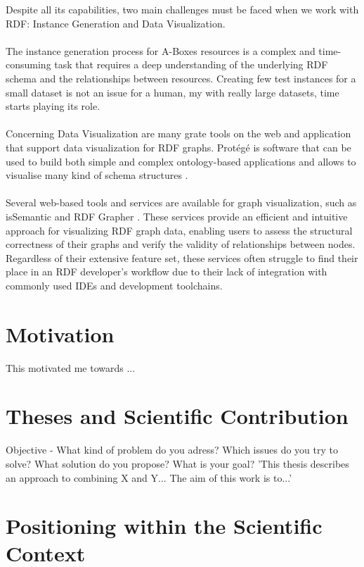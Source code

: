 Despite all its capabilities, two main challenges must be faced when we work with RDF: Instance Generation and Data Visualization.
\\
\\
The instance generation process for A-Boxes resources is a complex and time-consuming task that requires a deep understanding of the underlying RDF schema and the relationships between resources. 
Creating few test instances for a small dataset is not an issue for a human, my with really large datasets, time starts playing its role.
\\
\\
Concerning Data Visualization are many grate tools on the web and application that support data visualization for RDF graphs.
Protégé is software that can be used to build both simple and complex ontology-based applications and allows to visualise many kind of schema structures \cite{protege}.
\\
\\
Several web-based tools and services are available for graph visualization, such as isSemantic \cite{} and RDF Grapher \cite{}.
These services provide an efficient and intuitive approach for visualizing RDF graph data, enabling users to assess the structural correctness of their graphs and verify the validity of relationships between nodes.
\\
Regardless of their extensive feature set, these services often struggle to find their place in an RDF developer’s workflow due to their lack of integration with commonly used IDEs and development toolchains.
\section{Motivation\label{sec:moti}}


This motivated me towards ...

\section{Theses and Scientific Contribution  \label{sec:objective}}

Objective - What kind of problem do you adress? Which issues do you try to solve? What solution do you propose? What is your goal?
'This thesis describes an approach to combining X and Y... The aim of this work is to...'

\section{Positioning within the Scientific Context \label{sec:scope}}

